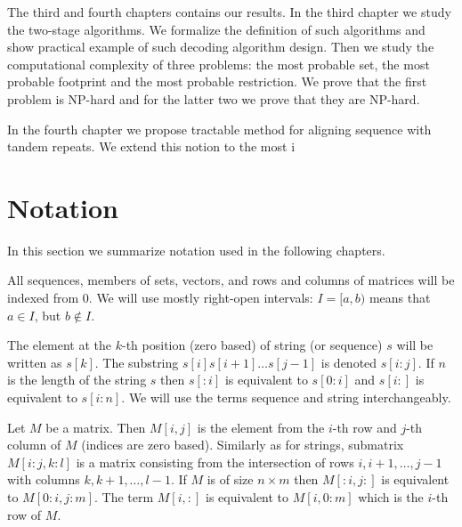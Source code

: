The third and fourth chapters contains our results. In the third chapter we
study the two-stage algorithms. We formalize the definition of such algorithms
and show practical example of such decoding algorithm design. Then we study the
computational complexity of three problems: the most probable set, the most
probable footprint and the most probable restriction. We prove that the first
problem is NP-hard and for the latter two we prove that they are NP-hard. 

In the fourth chapter we propose tractable method for aligning sequence with
tandem repeats. We extend this notion to the most i

\section{Notation}

In this section we summarize notation used in the following
chapters.

All sequences, members of sets, vectors, and rows and columns of matrices will
be indexed from $0$. We will use mostly right-open intervals: $I=[a,b)$ means
that $a\in I$, but $b\notin I$. 

The element at the $k$-th position (zero based) of string (or sequence) $s$ will
be written as $s[k]$. The substring $s[i]s[i+1]\dots s[j-1]$ is denoted
$s[i:j]$.  If $n$ is the length of the string $s$ then $s[:i]$ is equivalent to
$s[0:i]$ and $s[i:]$ is equivalent to $s[i:n]$.  We will use the terms sequence
and string interchangeably.

Let $M$ be a matrix. Then $M[i,j]$ is the element from the $i$-th row and $j$-th
column of $M$ (indices are zero based). Similarly as for strings, submatrix
$M[i:j,k:l]$ is a matrix consisting from the intersection of rows $i,i+1,\dots,
j-1$ with columns $k,k+1,\dots,l-1$. If $M$ is of size $n\times m$ then
$M[:i,j:]$ is equivalent to $M[0:i,j:m]$.  The term $M[i,:]$ is equivalent to
$M[i,0:m]$ which is the $i$-th row of $M$.
